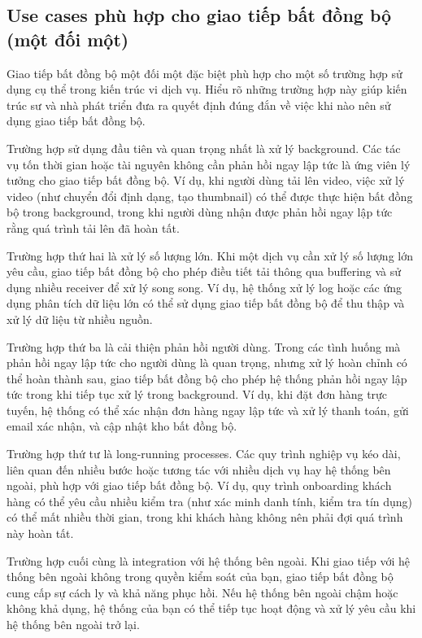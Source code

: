 \subsection{Use cases phù hợp cho giao tiếp bất đồng bộ (một đối một)}
Giao tiếp bất đồng bộ một đối một đặc biệt phù hợp cho một số trường hợp sử dụng cụ thể trong kiến trúc vi dịch vụ. Hiểu rõ những trường hợp này giúp kiến trúc sư và nhà phát triển đưa ra quyết định đúng đắn về việc khi nào nên sử dụng giao tiếp bất đồng bộ.

Trường hợp sử dụng đầu tiên và quan trọng nhất là xử lý background. Các tác vụ tốn thời gian hoặc tài nguyên không cần phản hồi ngay lập tức là ứng viên lý tưởng cho giao tiếp bất đồng bộ. Ví dụ, khi người dùng tải lên video, việc xử lý video (như chuyển đổi định dạng, tạo thumbnail) có thể được thực hiện bất đồng bộ trong background, trong khi người dùng nhận được phản hồi ngay lập tức rằng quá trình tải lên đã hoàn tất.

Trường hợp thứ hai là xử lý số lượng lớn. Khi một dịch vụ cần xử lý số lượng lớn yêu cầu, giao tiếp bất đồng bộ cho phép điều tiết tải thông qua buffering và sử dụng nhiều receiver để xử lý song song. Ví dụ, hệ thống xử lý log hoặc các ứng dụng phân tích dữ liệu lớn có thể sử dụng giao tiếp bất đồng bộ để thu thập và xử lý dữ liệu từ nhiều nguồn.

Trường hợp thứ ba là cải thiện phản hồi người dùng. Trong các tình huống mà phản hồi ngay lập tức cho người dùng là quan trọng, nhưng xử lý hoàn chỉnh có thể hoàn thành sau, giao tiếp bất đồng bộ cho phép hệ thống phản hồi ngay lập tức trong khi tiếp tục xử lý trong background. Ví dụ, khi đặt đơn hàng trực tuyến, hệ thống có thể xác nhận đơn hàng ngay lập tức và xử lý thanh toán, gửi email xác nhận, và cập nhật kho bất đồng bộ.

Trường hợp thứ tư là long-running processes. Các quy trình nghiệp vụ kéo dài, liên quan đến nhiều bước hoặc tương tác với nhiều dịch vụ hay hệ thống bên ngoài, phù hợp với giao tiếp bất đồng bộ. Ví dụ, quy trình onboarding khách hàng có thể yêu cầu nhiều kiểm tra (như xác minh danh tính, kiểm tra tín dụng) có thể mất nhiều thời gian, trong khi khách hàng không nên phải đợi quá trình này hoàn tất.

Trường hợp cuối cùng là integration với hệ thống bên ngoài. Khi giao tiếp với hệ thống bên ngoài không trong quyền kiểm soát của bạn, giao tiếp bất đồng bộ cung cấp sự cách ly và khả năng phục hồi. Nếu hệ thống bên ngoài chậm hoặc không khả dụng, hệ thống của bạn có thể tiếp tục hoạt động và xử lý yêu cầu khi hệ thống bên ngoài trở lại.

